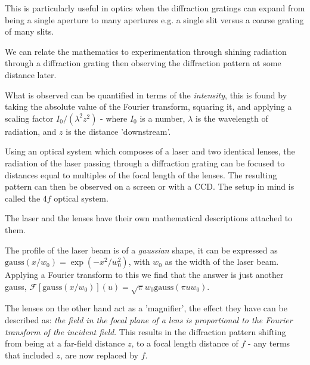 \documentclass[twocolumn]{revtex4}
\begin{document}
This is particularly useful in optics when the diffraction gratings can expand from being a single aperture to many apertures e.g. a single slit versus a coarse grating of many slits.

We can relate the mathematics to experimentation through shining radiation through a diffraction grating then observing the diffraction pattern at some distance later. 

What is observed can be quantified in terms of the \textit{intensity}, this is found by taking the absolute value of the Fourier transform, squaring it, and applying a scaling factor $I_0/(\lambda^2z^2)$ - where $I_0$ is a number, $\lambda$ is the wavelength of radiation, and $z$ is the distance 'downstream'.

Using an optical system which composes of a laser and two identical lenses, the radiation of the laser passing through a diffraction grating can be focused to distances equal to multiples of the focal length of the lenses. The resulting pattern can then be observed on a screen or with a CCD. The setup in mind is called the $4f$ optical system.

The laser and the lenses have their own mathematical descriptions attached to them.

The profile of the laser beam is of a \textit{gaussian} shape, it can be expressed as $\text{gauss}(x/w_0)=\exp{(-x^2/w_0^2)}$, with $w_0$ as the width of the laser beam. Applying a Fourier transform to this we find that the answer is just another gauss, $\mathcal{F}[\text{gauss}(x/w_0)](u)=\sqrt{\pi}w_0\text{gauss}(\pi u w_0)$.

The lenses on the other hand act as a 'magnifier', the effect they have can be described as: \textit{the field in the focal plane of a lens is proportional to the Fourier transform of the incident field}. This results in the diffraction pattern shifting from being at a far-field distance $z$, to a focal length distance of $f$ - any terms that included $z$, are now replaced by $f$.

\vspace{-3ex}
\end{document}
